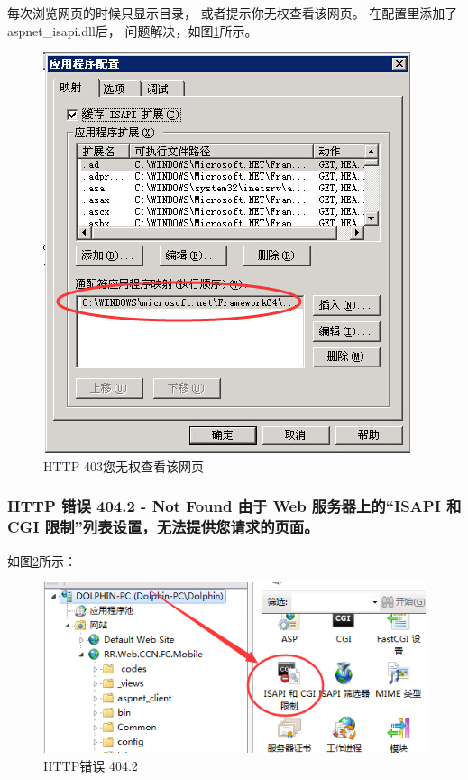 \documentclass{book}
\begin{document}
每次浏览网页的时候只显示目录，
或者提示你无权查看该网页。
在配置里添加了aspnet\_isapi.dll后，
问题解决，如图\ref{fig:HTTP403ErrorSolution}所示。

\begin{figure}[htbp]
	\centering
	\includegraphics[scale=0.8]{HTTP403ErrorSolution.jpg}
	\caption{HTTP 403您无权查看该网页}
	\label{fig:HTTP403ErrorSolution}
\end{figure}

\subsubsection{HTTP 错误 404.2 - Not Found 由于 Web 服务器上的“ISAPI 和 CGI 限制”列表设置，无法提供您请求的页面。}

如图\ref{fig:ISAPIAndCGI}所示：

\begin{figure}[htbp]
	\centering
	\includegraphics[scale=0.8]{ISAPIAndCGI.png}
	\caption{HTTP错误 404.2}
	\label{fig:ISAPIAndCGI}
\end{figure}
\end{document}

